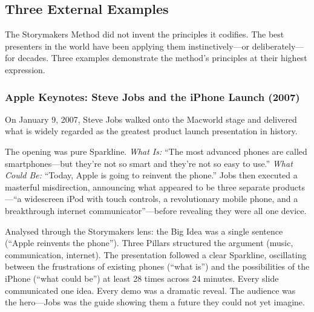 \subsection{Three External Examples}

The Storymakers Method did not invent the principles it codifies. The best presenters in the world have been applying them instinctively---or deliberately---for decades. Three examples demonstrate the method's principles at their highest expression.


\subsubsection{Apple Keynotes: Steve Jobs and the iPhone Launch (2007)}

On January 9, 2007, Steve Jobs walked onto the Macworld stage and delivered what is widely regarded as the greatest product launch presentation in history.

The opening was pure Sparkline. \emph{What Is:} ``The most advanced phones are called smartphones---but they're not so smart and they're not so easy to use.'' \emph{What Could Be:} ``Today, Apple is going to reinvent the phone.'' Jobs then executed a masterful misdirection, announcing what appeared to be three separate products---``a widescreen iPod with touch controls, a revolutionary mobile phone, and a breakthrough internet communicator''---before revealing they were all one device.

Analysed through the Storymakers lens: the Big Idea was a single sentence (``Apple reinvents the phone''). Three Pillars structured the argument (music, communication, internet). The presentation followed a clear Sparkline, oscillating between the frustrations of existing phones (``what is'') and the possibilities of the iPhone (``what could be'') at least 28 times across 24 minutes. Every slide communicated one idea. Every demo was a dramatic reveal. The audience was the hero---Jobs was the guide showing them a future they could not yet imagine.

